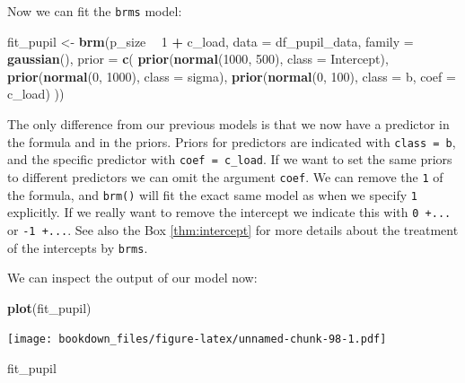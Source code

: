 \documentclass[12pt,]{krantz}
\newenvironment{Shaded}{\begin{snugshade}}{\end{snugshade}}
\newcommand{\KeywordTok}[1]{\textcolor[rgb]{0.13,0.29,0.53}{\textbf{#1}}}
\newcommand{\DataTypeTok}[1]{\textcolor[rgb]{0.13,0.29,0.53}{#1}}
\newcommand{\DecValTok}[1]{\textcolor[rgb]{0.00,0.00,0.81}{#1}}
\newcommand{\StringTok}[1]{\textcolor[rgb]{0.31,0.60,0.02}{#1}}
\newcommand{\OperatorTok}[1]{\textcolor[rgb]{0.81,0.36,0.00}{\textbf{#1}}}
\newcommand{\NormalTok}[1]{#1}
\theoremstyle{definition}
\theoremstyle{definition}
\theoremstyle{definition}
\theoremstyle{remark}
\begin{document}
Now we can fit the \texttt{brms} model:

\begin{Shaded}
\begin{Highlighting}[]
\NormalTok{fit_pupil <-}\StringTok{ }\KeywordTok{brm}\NormalTok{(p_size }\OperatorTok{~}\StringTok{ }\DecValTok{1} \OperatorTok{+}\StringTok{ }\NormalTok{c_load,}
                 \DataTypeTok{data =}\NormalTok{ df_pupil_data,}
                 \DataTypeTok{family =} \KeywordTok{gaussian}\NormalTok{(),}
                 \DataTypeTok{prior =} \KeywordTok{c}\NormalTok{(}
                     \KeywordTok{prior}\NormalTok{(}\KeywordTok{normal}\NormalTok{(}\DecValTok{1000}\NormalTok{, }\DecValTok{500}\NormalTok{), }\DataTypeTok{class =}\NormalTok{ Intercept),}
                     \KeywordTok{prior}\NormalTok{(}\KeywordTok{normal}\NormalTok{(}\DecValTok{0}\NormalTok{, }\DecValTok{1000}\NormalTok{), }\DataTypeTok{class =}\NormalTok{ sigma),}
                     \KeywordTok{prior}\NormalTok{(}\KeywordTok{normal}\NormalTok{(}\DecValTok{0}\NormalTok{, }\DecValTok{100}\NormalTok{), }\DataTypeTok{class =}\NormalTok{ b, }\DataTypeTok{coef =}\NormalTok{ c_load)}
\NormalTok{                 )) }
\end{Highlighting}
\end{Shaded}

The only difference from our previous models is that we now have a
predictor in the formula and in the priors. Priors for predictors are
indicated with \texttt{class\ =\ b}, and the specific predictor with
\texttt{coef\ =\ c\_load}. If we want to set the same priors to
different predictors we can omit the argument \texttt{coef}. We can
remove the \texttt{1} of the formula, and \texttt{brm()} will fit the
exact same model as when we specify \texttt{1} explicitly. If we really
want to remove the intercept we indicate this with \texttt{0\ +...} or
\texttt{-1\ +...}. See also the Box \ref{thm:intercept} for more details
about the treatment of the intercepts by \texttt{brms}.

We can inspect the output of our model now:

\begin{Shaded}
\begin{Highlighting}[]
\KeywordTok{plot}\NormalTok{(fit_pupil)}
\end{Highlighting}
\end{Shaded}

\texttt{[image: bookdown\_files/figure-latex/unnamed-chunk-98-1.pdf]}

\begin{Shaded}
\begin{Highlighting}[]
\NormalTok{fit_pupil}
\end{Highlighting}
\end{Shaded}
\end{document}

